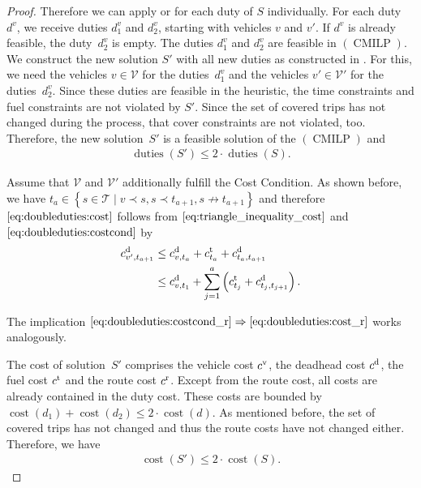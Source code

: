 \begin{proof}
Therefore we can apply  or  for each duty of $S$ individually. For each duty~$d^v$, we receive duties $d^v_1$ and $d^v_2$, starting with vehicles $v$ and $v'$. If $d^v$ is already feasible, the duty~$d^v_2$ is empty. The duties $d^v_1$ and $d^v_2$ are feasible in $(\operatorname{CMILP})$. We construct the new solution $S'$ with all new duties as constructed in . For this, we need the vehicles $v\in\mathcal{V}$ for the duties~$d^v_1$ and the vehicles ${v'\in\mathcal{V}'}$ for the duties~$d^v_2$. Since these duties are feasible in the heuristic, the time constraints and fuel constraints are not violated by $S'$. Since the set of covered trips has not changed during the process, that cover constraints are not violated, too. Therefore, the new solution~$S'$ is a feasible solution of the $(\operatorname{CMILP})$ and
\begin{align*}
	\operatorname{duties}\left(S'\right) \leq 2\cdot\operatorname{duties}\left(S\right).
\end{align*}

Assume that $\mathcal{V}$ and $\mathcal{V}'$ additionally fulfill the Cost Condition. As shown before, we have ${t_a\in\left\{s\in\mathcal{T}\mid v\prec s, s\prec t_{a+1}, s\not\to t_{a+1}\right\}}$ and therefore $\eqref{eq:doubleduties:cost}$ follows from $\eqref{eq:triangle_inequality_cost}$ and $\eqref{eq:doubleduties:costcond}$ by
\begin{align*}
	c^{\operatorname{d}}_{v',t_{a+1}} & \leq c^{\operatorname{d}}_{v,t_a} + c^{\operatorname{t}}_{t_a} + c^{\operatorname{d}}_{t_a,t_{a+1}} \\
	& \leq c^{\operatorname{d}}_{v,t_1} + \sum_{j=1}^a \left(c^{\operatorname{t}}_{t_j} + c^{\operatorname{d}}_{t_j,t_{j+1}}\right).
\end{align*}

The implication ${\eqref{eq:doubleduties:costcond_r}\Rightarrow\eqref{eq:doubleduties:cost_r}}$ works analogously.

The cost of solution~$S'$ comprises the vehicle cost $c^{\operatorname{v}}$, the deadhead cost $c^{\operatorname{d}}$, the fuel cost $c^{\operatorname{t}}$ and the route cost $c^{\operatorname{r}}$. Except from the route cost, all costs are already contained in the duty cost. These costs are bounded by ${\operatorname{cost}\left(d_1\right) + \operatorname{cost}\left(d_2\right) \leq 2\cdot\operatorname{cost}\left(d\right)}$. As mentioned before, the set of covered trips has not changed and thus the route costs have not changed either. Therefore, we have
\begin{align*}
	\operatorname{cost}\left(S'\right) \leq 2\cdot\operatorname{cost}\left(S\right).
\end{align*}
%
\end{proof}

